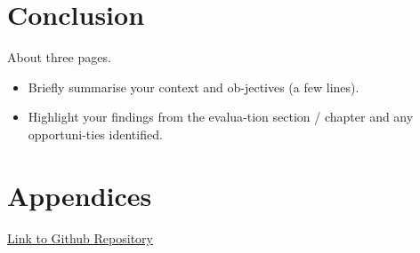 \chapter{Conclusion}
About three pages.

\begin{itemize}
\item Briefly summarise your context and ob-jectives (a few lines).
\item Highlight your findings from the evalua-tion section / chapter and any opportuni-ties identified.
\end{itemize}

\chapter{Appendices}
\href{https://github.com/MarkReillyGMIT/AppliedProject}{Link to Github Repository}

